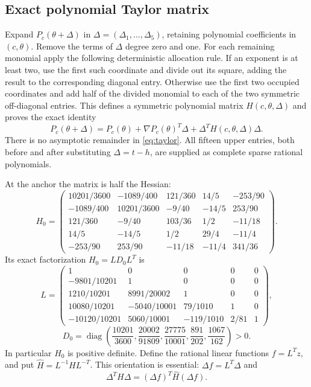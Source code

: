 \subsection{Exact polynomial Taylor matrix}

Expand $P_c(\theta+\Delta)$ in $\Delta=(\Delta_1,\ldots,\Delta_5)$, retaining
polynomial coefficients in $(c,\theta)$. Remove the terms of $\Delta$ degree
zero and one. For each remaining monomial apply the following deterministic
allocation rule. If an exponent is at least two, use the first such coordinate
and divide out its square, adding the result to the corresponding diagonal
entry. Otherwise use the first two occupied coordinates and add half of the
divided monomial to each of the two symmetric off-diagonal entries. This
defines a symmetric polynomial matrix $H(c,\theta,\Delta)$ and proves the
exact identity
\begin{equation}
 P_c(\theta+\Delta)=P_c(\theta)+\nabla P_c(\theta)^T\Delta
                 +\Delta^TH(c,\theta,\Delta)\Delta.
 \label{eq:taylor}
\end{equation}
There is no asymptotic remainder in \eqref{eq:taylor}. All fifteen upper
entries, both before and after substituting $\Delta=t-h$, are supplied as
complete sparse rational polynomials.

At the anchor the matrix is half the Hessian:
\begin{equation}
 H_0=
 \begin{pmatrix}
 10201/3600&-1089/400&121/360&14/5&-253/90\\
 -1089/400&10201/3600&-9/40&-14/5&253/90\\
 121/360&-9/40&103/36&1/2&-11/18\\
 14/5&-14/5&1/2&29/4&-11/4\\
 -253/90&253/90&-11/18&-11/4&341/36
 \end{pmatrix}.
 \label{eq:hessian}
\end{equation}
Its exact factorization $H_0=LD_0L^T$ is
\begin{equation}
 L=\begin{pmatrix}
 1&0&0&0&0\\
 -9801/10201&1&0&0&0\\
 1210/10201&8991/20002&1&0&0\\
 10080/10201&-5040/10001&79/1010&1&0\\
 -10120/10201&5060/10001&-119/1010&2/81&1
 \end{pmatrix},
 \label{eq:L}
\end{equation}
\begin{equation}
 D_0=\operatorname{diag}\left(
 \frac{10201}{3600},\frac{20002}{91809},\frac{27775}{10001},
 \frac{891}{202},\frac{1067}{162}\right)>0.
 \label{eq:pivots}
\end{equation}
In particular $H_0$ is positive definite. Define the rational linear functions
$f=L^Tz$, and put $\widehat H=L^{-1}HL^{-T}$. This orientation is essential:
$\Delta f=L^T\Delta$ and
\begin{equation}
 \Delta^TH\Delta=(\Delta f)^T\widehat H(\Delta f).
 \label{eq:orientation}
\end{equation}

